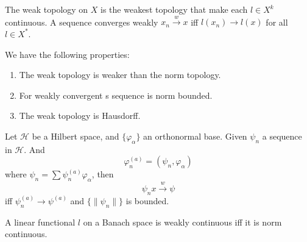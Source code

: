 \documentclass[openany]{book}
\begin{document}



\begin{defn}
    The weak topology on $X$ is the weakest topology that make each $l\in X^k$ continuous. A sequence converges weakly $x_n\xrightarrow{w} x$ iff $l(x_n)\to l(x)$ for all $l\in X^*$.
\end{defn}



\begin{prop}
    We have the following properties:
    \begin{enumerate}
        \item The weak topology is weaker than the norm topology.
        \item For weakly convergent s sequence is norm bounded.
        \item The weak topology is Hausdorff.
    \end{enumerate}
\end{prop}
\begin{example}
    Let $\mathcal{H}$ be a Hilbert space, and $\{\varphi_\alpha\}$ an orthonormal base. Given $\psi_n$ a sequence in $\mathcal{H}$. And 
    \begin{equation*}
        \varphi_n^{(a)}=(\psi_n,\varphi_\alpha)
    \end{equation*}
    where $\psi_n=\sum\psi_n^{(a)}\varphi_\alpha$, then 
    \begin{equation*}
        \psi_nx\xrightarrow{w}\psi
    \end{equation*}
    iff $\psi_n^{(a)}\to\psi^{(a)}$ and $\{\|\psi_n\|\}$ is bounded. 
\end{example}

\begin{prop}
    A linear functional $l$ on a Banach space is weakly continuous iff it is norm continuous.
\end{prop}
\end{document}
